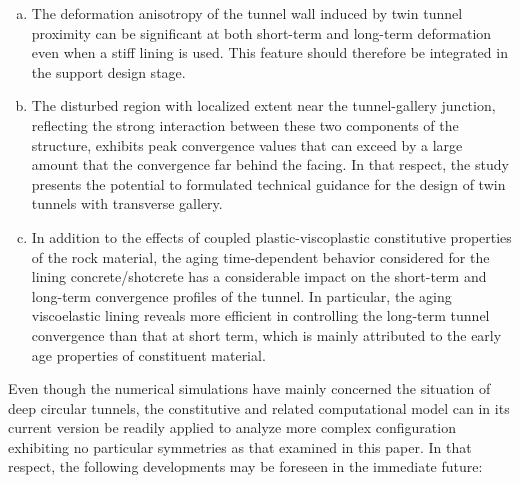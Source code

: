 \documentclass[a4paper,fleqn]{cas-sc}
\begin{document}
\begin{enumerate}[(a)]
	
	\item The deformation anisotropy of the tunnel wall induced by twin tunnel proximity can be significant at both short-term and long-term deformation even when a stiff lining is used. This feature should therefore be integrated in the support design stage.
	
	\item The disturbed region with localized extent near the tunnel-gallery junction, reflecting the strong interaction between these two components of the structure, exhibits peak convergence values that can exceed by a large amount that the convergence far behind the facing. In that respect, the study presents the potential to formulated technical guidance for the design of twin tunnels with transverse gallery.
	
	\item In addition to the effects of coupled plastic-viscoplastic constitutive properties of the rock material, the aging time-dependent behavior considered for the lining concrete/shotcrete has a considerable impact on the short-term and long-term convergence profiles of the tunnel. In particular, the aging viscoelastic lining reveals more efficient in controlling the long-term tunnel convergence than that at short term, which is mainly attributed to the early age properties of constituent material.
	
\end{enumerate}

Even though the numerical simulations have mainly concerned the situation of deep circular tunnels, the constitutive and related computational model can in its current version be readily applied to analyze more complex configuration exhibiting no particular symmetries as that examined in this paper. In that respect, the following developments may be foreseen in the immediate future:
\end{document}
